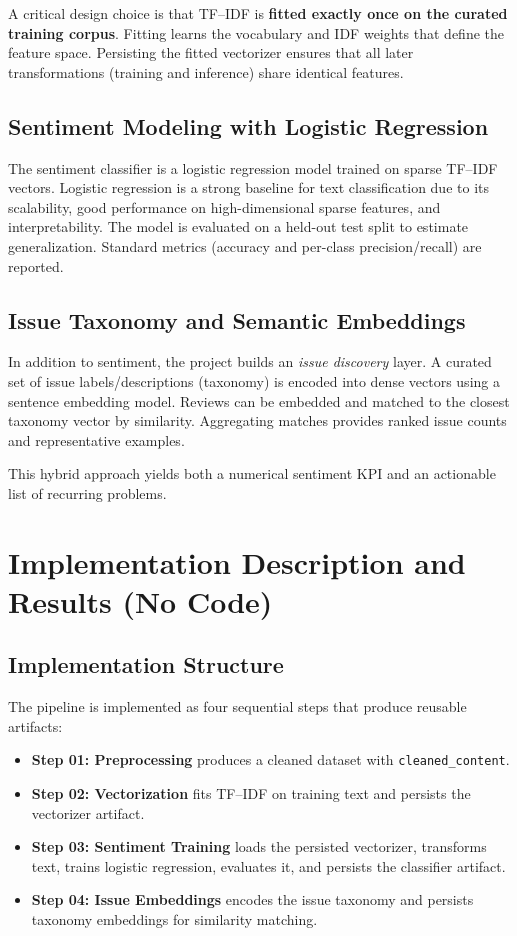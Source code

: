 \documentclass[12pt]{article}
\begin{document}
A critical design choice is that TF--IDF is \textbf{fitted exactly once on the curated training corpus}. Fitting learns the vocabulary and IDF weights that define the feature space. Persisting the fitted vectorizer ensures that all later transformations (training and inference) share identical features.

\subsection{Sentiment Modeling with Logistic Regression}
The sentiment classifier is a logistic regression model trained on sparse TF--IDF vectors. Logistic regression is a strong baseline for text classification due to its scalability, good performance on high-dimensional sparse features, and interpretability. The model is evaluated on a held-out test split to estimate generalization. Standard metrics (accuracy and per-class precision/recall) are reported.

\subsection{Issue Taxonomy and Semantic Embeddings}
In addition to sentiment, the project builds an \emph{issue discovery} layer. A curated set of issue labels/descriptions (taxonomy) is encoded into dense vectors using a sentence embedding model. Reviews can be embedded and matched to the closest taxonomy vector by similarity. Aggregating matches provides ranked issue counts and representative examples.

This hybrid approach yields both a numerical sentiment KPI and an actionable list of recurring problems.

\section{Implementation Description and Results (No Code)}
\subsection{Implementation Structure}
The pipeline is implemented as four sequential steps that produce reusable artifacts:
\begin{itemize}
  \item \textbf{Step 01: Preprocessing} produces a cleaned dataset with \texttt{cleaned\_content}.
  \item \textbf{Step 02: Vectorization} fits TF--IDF on training text and persists the vectorizer artifact.
  \item \textbf{Step 03: Sentiment Training} loads the persisted vectorizer, transforms text, trains logistic regression, evaluates it, and persists the classifier artifact.
  \item \textbf{Step 04: Issue Embeddings} encodes the issue taxonomy and persists taxonomy embeddings for similarity matching.
\end{itemize}
\end{document}
